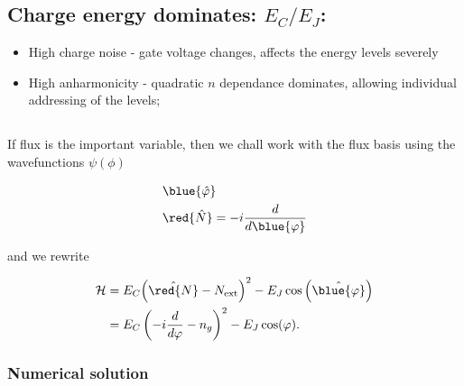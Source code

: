  \subsection{Charge energy dominates: $ E_C/E_J $:}
 \begin{itemize}
 \item  High charge  noise -  gate voltage  changes, affects  the energy
   levels severely
 \item  High  anharmonicity -  quadratic  $  n $  dependance  dominates,
   allowing individual addressing of the levels;
 \end{itemize}

 \newpage
 \subsection{}
 If flux  is the important  variable, then we  chall work with  the flux
 basis using the wavefunctions $ \psi(\phi) $

 \begin{framed}\noindent

   \begin{equation}
     \begin{aligned}
       &\blue{\hat{\varphi}} \qquad\\
       &\red{\hat{N}} = -i\frac{d}{d\blue{\varphi}}
     \end{aligned}
   \end{equation}

 \end{framed}
 \noindent and we rewrite

 \begin{equation}\label{eq:transmon-in-phase-basis}
   \begin{aligned}
     \mathcal{H} & = E_C{\left(\hat{\red{N}}-N_\text{ext}\right)^2}- E_J\cos\left(\hat{\blue{\varphi}}\right)\\
     &    =     E_C\left(-i\frac{d}{d\varphi}    -     n_g\right)^2    -
     E_J\cos(\varphi).
   \end{aligned}
 \end{equation}

 \subsubsection{Numerical solution}
 \label{sec:transmon-flux-numerical-solution}

